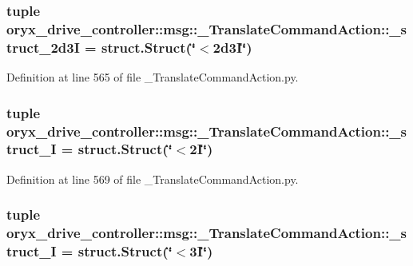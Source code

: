 \subsubsection[{\-\_\-struct\-\_\-2d3\-I}]{\setlength{\rightskip}{0pt plus 5cm}tuple {\bf oryx\-\_\-drive\-\_\-controller\-::msg\-::\-\_\-\-Translate\-Command\-Action\-::\-\_\-struct\-\_\-2d3\-I} = struct.\-Struct(\char`\"{}$<$2d3\-I\char`\"{})}\label{namespaceoryx__drive__controller_1_1msg_1_1__TranslateCommandAction_a076f95fe37b47eb5766a1a81333e0820}


\-Definition at line 565 of file \-\_\-\-Translate\-Command\-Action.\-py.

\subsubsection[{\-\_\-struct\-\_\-2\-I}]{\setlength{\rightskip}{0pt plus 5cm}tuple {\bf oryx\-\_\-drive\-\_\-controller\-::msg\-::\-\_\-\-Translate\-Command\-Action\-::\-\_\-struct\-\_\-I} = struct.\-Struct(\char`\"{}$<$2\-I\char`\"{})}\label{namespaceoryx__drive__controller_1_1msg_1_1__TranslateCommandAction_a615852f465903615c246b5ef37a21c14}


\-Definition at line 569 of file \-\_\-\-Translate\-Command\-Action.\-py.

\subsubsection[{\-\_\-struct\-\_\-3\-I}]{\setlength{\rightskip}{0pt plus 5cm}tuple {\bf oryx\-\_\-drive\-\_\-controller\-::msg\-::\-\_\-\-Translate\-Command\-Action\-::\-\_\-struct\-\_\-I} = struct.\-Struct(\char`\"{}$<$3\-I\char`\"{})}\label{namespaceoryx__drive__controller_1_1msg_1_1__TranslateCommandAction_a98eec441fdaede874d7a50039ac496cb}


